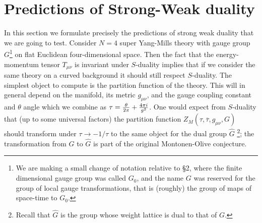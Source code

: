 \documentclass[12pt]{article}
\numberwithin{equation}{section}
\def\tilde{\widetilde}
\def\bar{\overline}
\begin{document}
\section{Predictions of Strong-Weak duality}
\def\tilde{\widetilde}
\def\hat{\widehat}
\def\bar{\overline}
In this section we formulate precisely the predictions of strong weak duality
that we are going to test.  Consider $N=4$ super Yang-Mills theory
with gauge group $G$\footnote{We are making a small change of
  notation relative to \S2, where the finite dimensional gauge group
  was called $G_0$, and the name $G$ was reserved for the group of
  local gauge transformations, that is (roughly) the group of maps of
space-time to $G_0$.}
on flat Euclidean four-dimensional space.
Then the fact that
the energy-momentum tensor $T_{\mu \nu}$ is invariant under $S$-duality
implies that if we consider the same theory on a curved background it
should still respect $S$-duality.  The simplest object to compute
is the partition function of the theory. This will in general depend
on the manifold, its metric $g_{\mu \nu}$, and the gauge coupling constant
and $\theta $ angle which we combine as $\tau={\theta \over 2\pi}+
{4\pi i\over g^2}$.  One would expect from $S$-duality that (up to some
universal factors) the partition function
$Z_M(\tau, \bar \tau,g_{\mu \nu},G)$ should
transform under $\tau \rightarrow -{1/\tau}$
to the same object for the dual group $\widehat G$
\footnote{Recall that $\widehat G$ is the group whose weight lattice
is dual to that of $G$.};
the transformation
from $G$ to $\widehat G$ is part of the original Montonen-Olive
conjecture.
\end{document}
